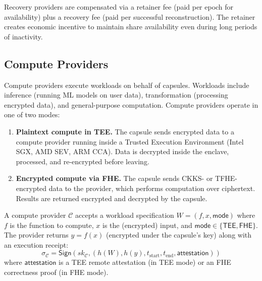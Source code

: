 Recovery providers are compensated via a retainer fee (paid per epoch for
availability) plus a recovery fee (paid per successful reconstruction).
The retainer creates economic incentive to maintain share availability
even during long periods of inactivity.

\subsection{Compute Providers}

Compute providers execute workloads on behalf of capsules. Workloads include
inference (running ML models on user data), transformation (processing
encrypted data), and general-purpose computation. Compute providers operate
in one of two modes:

\begin{enumerate}
    \item \textbf{Plaintext compute in TEE.} The capsule sends encrypted data
    to a compute provider running inside a Trusted Execution Environment (Intel
    SGX, AMD SEV, ARM CCA). Data is decrypted inside the enclave, processed,
    and re-encrypted before leaving.
    \item \textbf{Encrypted compute via FHE.} The capsule sends CKKS- or
    TFHE-encrypted data to the provider, which performs computation over
    ciphertext. Results are returned encrypted and decrypted by the capsule.
\end{enumerate}

\begin{definition}
A compute provider $\mathcal{C}$ accepts a workload specification $W = (f, x, \mathsf{mode})$
where $f$ is the function to compute, $x$ is the (encrypted) input, and
$\mathsf{mode} \in \{\mathsf{TEE}, \mathsf{FHE}\}$. The provider returns
$y = f(x)$ (encrypted under the capsule's key) along with an execution receipt:
\begin{equation}
    \sigma_{\mathcal{C}} = \mathsf{Sign}(sk_{\mathcal{C}}, (h(W), h(y), t_{\text{start}}, t_{\text{end}}, \mathsf{attestation}))
\end{equation}
where $\mathsf{attestation}$ is a TEE remote attestation (in TEE mode) or an
FHE correctness proof (in FHE mode).
\end{definition}

